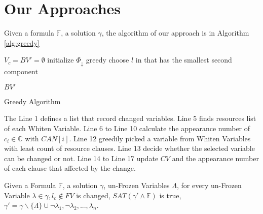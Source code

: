 \section{Our Approaches}\label{sec:approaches}

Given a formula $\mathbb F$, a solution $\gamma$, the algorithm of our approach is in Algorithm \ref{alg:greedy}

\begin{algorithm}[H]
\SetAlgoShortEnd
\SetFillComment
{}
       $V_c=BV'=\emptyset$\;
	   initialize $\Phi_\downarrow$\;
       greedy choose $l$ in that has the smallest second component\;

	   \Return $BV'$\;
	 \caption{Greedy Algorithm}
	 \label{alg:greedy}
\end{algorithm}


The Line 1 defines a list that record changed variables. Line 5 finds resources list of each Whiten Variable. Line 6 to Line 10 calculate the appearance number of $c_i \in \mathbb C$ with $CAN[i]$. Line 12 greedily picked a variable from Whiten Variables with least count of resource clauses. Line 13 decide whether the selected variable can be changed or not. Line 14 to Line 17 update $CV$ and the appearance number of each clause that affected by the change.


\begin{theorem}
Given a Formula $\mathbb F$, a solution $\gamma$,  un-Frozen Variables $\Lambda$, for every un-Frozen Variable $\lambda \in \gamma, l_c \notin FV$ is changed, $SAT(\gamma \prime \wedge \mathbb F)$ is true, $\gamma \prime = \gamma \backslash \{\Lambda\} \cup {\neg \lambda_1, \neg \lambda_2, ..., \lambda_n}$.
\end{theorem}

